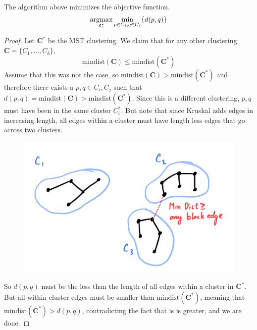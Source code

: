     \begin{theorem}
      The algorithm above minimizes the objective function. 
      \begin{equation}
        \operatorname*{\arg\!\max}_{\mathbf{C}} \min_{p \in C_i, q \in C_j} \{ d(p, q) \}
      \end{equation}
    \end{theorem}
    \begin{proof}
      Let $\mathbf{C}^\ast$ be the MST clustering. We claim that for any other clustering $\mathbf{C} = \{C_1, \ldots, C_k\}$,  
      \begin{equation}
        \mathrm{min dist}(\mathbf{C}) \leq \mathrm{min dist}(\mathbf{C}^{\ast})
      \end{equation}
      Assume that this was not the case, so $\mathrm{min dist}(\mathbf{C}) > \mathrm{min dist}(\mathbf{C}^{\ast})$ and therefore there exists a $p, q \in C_i, C_j$ such that $d(p, q) = \mathrm{mindist}(\mathbf{C}) > \mathrm{min dist}(\mathbf{C}^\ast)$. Since this is a different clustering, $p, q$ must have been in the same cluster $C_i^\ast$. But note that since Kruskal adds edges in increasing length, all edges within a cluster must have length less edges that go across two clusters. 

      \begin{figure}[H]
        \centering 
        \includegraphics[scale=0.4]{img/mindist.png}
        \label{fig:mindist}
      \end{figure}

      So $d(p, q)$ must be the less than the length of all edges within a cluster in $\mathbf{C}^\ast$. But all within-cluster edges must be smaller than $\mathrm{min dist}(\mathbf{C}^\ast)$, meaning that $\mathrm{min dist}(\mathbf{C}^\ast) > d(p, q)$, contradicting the fact that is is greater, and we are done. 
    \end{proof}

